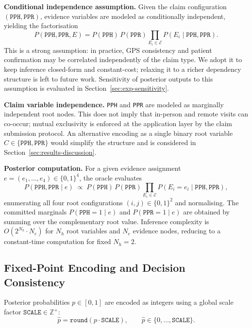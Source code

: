\documentclass[journal]{IEEEtran}
\begin{document}
\noindent\textbf{Conditional independence assumption.}
Given the claim configuration $(\texttt{PPH},
\texttt{PPR})$, evidence variables are modeled as
conditionally independent, yielding the factorisation
\begin{equation}
  P(\texttt{PPH},\texttt{PPR},E)
  =
  P(\texttt{PPH})\,P(\texttt{PPR})
  \prod_{E_i\in\mathcal{E}}
  P(E_i\mid \texttt{PPH},\texttt{PPR}).
  \label{eq:factorization}
\end{equation}
This is a strong assumption: in practice, GPS
consistency and patient confirmation may be correlated
independently of the claim type. We adopt it to keep
inference closed-form and constant-cost; relaxing it
to a richer dependency structure is left to future
work. Sensitivity of posterior outputs to this
assumption is evaluated in
Section~\ref{sec:exp-sensitivity}.

\noindent\textbf{Claim variable independence.}
\texttt{PPH} and \texttt{PPR} are modeled as
marginally independent root nodes. This does not imply
that in-person and remote visits can co-occur; mutual
exclusivity is enforced at the application layer by
the claim submission protocol. An alternative encoding
as a single binary root variable
$C\in\{\texttt{PPH},\texttt{PPR}\}$ would simplify the
structure and is considered in
Section~\ref{sec:results-discussion}.

\noindent\textbf{Posterior computation.}
For a given evidence assignment
$e=(e_1,\dots,e_4)\in\{0,1\}^4$, the oracle evaluates
\begin{equation}
  P(\texttt{PPH},\texttt{PPR}\mid e)
  \;\propto\;
  P(\texttt{PPH})\,P(\texttt{PPR})
  \prod_{E_i\in\mathcal{E}}
  P(E_i=e_i\mid \texttt{PPH},\texttt{PPR}),
  \label{eq:posterior}
\end{equation}
enumerating all four root configurations
$(i,j)\in\{0,1\}^2$ and normalising.
The committed marginals $P(\texttt{PPH}=1\mid e)$ and
$P(\texttt{PPR}=1\mid e)$ are obtained by summing over
the complementary root value. Inference complexity is
$O(2^{N_h}\cdot N_e)$ for $N_h$ root variables and
$N_e$ evidence nodes, reducing to a constant-time
computation for fixed $N_h=2$.

\subsection{Fixed-Point Encoding and Decision
Consistency}

Posterior probabilities $p\in[0,1]$ are encoded as
integers using a global scale factor
$\texttt{SCALE}\in\mathbb{Z}^+$:
\[
  \widehat{p}
  = \texttt{round}(p\cdot\texttt{SCALE}),
  \qquad
  \widehat{p}\in\{0,\dots,\texttt{SCALE}\}.
\]
\end{document}
